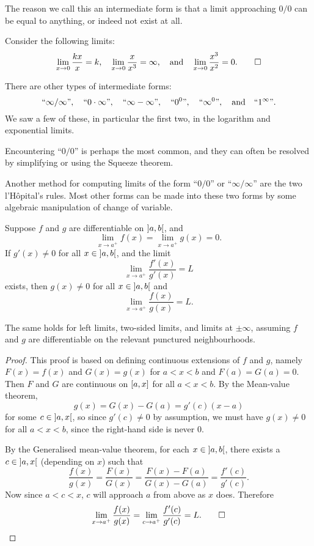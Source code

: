 The reason we call this an intermediate form is that a limit approaching $0 / 0$ can be equal to anything, or indeed not exist at all.

\begin{examples}
	Consider the following limits:
	\[
		\lim_{x \to 0} \frac{k x}{x} = k, \quad \lim_{x \to 0} \frac{x}{x^3} = \infty, \quad \text{and} \quad \lim_{x \to 0} \frac{x^3}{x^2} = 0. \qedhere
	\]
\end{examples}

\noindent
There are other types of intermediate forms:
\[
	``\infty / \infty ", \quad ``0 \cdot \infty", \quad ``\infty - \infty", \quad ``0^0", \quad ``\infty^0", \quad \text{and} \quad ``1^\infty".
\]
We saw a few of these, in particular the first two, in the logarithm and exponential limits.

Encountering ``$0 / 0$'' is perhaps the most common, and they can often be resolved by simplifying or using the Squeeze theorem.

Another method for computing limits of the form ``$0 / 0$'' or ``$\infty / \infty$'' are the two l'H\^{o}pital's rules. Most other forms can be made into these two forms by some algebraic manipulation of change of variable.

\begin{theorem}
	Suppose $f$ and $g$ are differentiable on $\interval[open]{a}{b}$, and
	\[
		\lim_{x \to a^+} f(x) = \lim_{x \to a^+} g(x) = 0.
	\]
	If $g'(x) \neq 0$ for all $x \in \interval[open]{a}{b}$, and the limit
	\[
		\lim_{x \to a^+} \frac{f'(x)}{g'(x)} = L
	\]
	exists, then $g(x) \neq 0$ for all $x \in \interval[open]{a}{b}$ and
	\[
		\lim_{x \to a^+} \frac{f(x)}{g(x)} = L.
	\]
\end{theorem}

\begin{remark}
	The same holds for left limits, two-sided limits, and limits at $\pm \infty$, assuming $f$ and $g$ are differentiable on the relevant punctured neighbourhoods.
\end{remark}

\begin{proof}
	This proof is based on defining continuous extensions of $f$ and $g$, namely $F(x) = f(x)$ and $G(x) = g(x)$ for $a < x < b$ and $F(a) = G(a) = 0$.
	Then $F$ and $G$ are continuous on $\interval{a}{x}$ for all $a < x < b$.
	By the Mean-value theorem,
	\[
		g(x) = G(x) - G(a) = g'(c) (x - a)
	\]
	for some $c \in \interval[open]{a}{x}$, so since $g'(c) \neq 0$ by assumption, we must have $g(x) \neq 0$ for all $a < x < b$, since the right-hand side is never $0$.

	By the Generalised mean-value theorem, for each $x \in \interval[open]{a}{b}$, there exists a $c \in \interval[open]{a}{x}$ (depending on $x$) such that
	\[
		\frac{f(x)}{g(x)} = \frac{F(x)}{G(x)} = \frac{F(x) - F(a)}{G(x) - G(a)} = \frac{f'(c)}{g'(c)}.
	\]
	Now since $a < c < x$, $c$ will approach $a$ from above as $x$ does.
	Therefore
	\[
		\lim_{x \to a^+} \frac{f(x)}{g(x)} = \lim_{c \to a^+} \frac{f'(c)}{g'(c)} = L. \qedhere
	\]
\end{proof}

